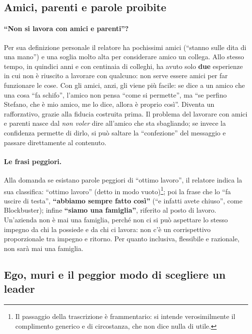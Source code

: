 \subsection{Amici, parenti e parole proibite}

\paragraph{``Non si lavora con amici e parenti''?} Per sua definizione
personale il relatore ha pochissimi amici (``stanno sulle dita di una mano'')
e una soglia molto alta per considerare amico un collega. Allo stesso tempo,
in quindici anni e con centinaia di colleghi, ha avuto solo \textbf{due}
esperienze in cui non è riuscito a lavorare con qualcuno: non serve essere
amici per far funzionare le cose. Con gli amici, anzi, gli viene più facile:
se dice a un amico che una cosa ``fa schifo'', l'amico non pensa ``come si
permette'', ma ``se perfino Stefano, che è mio amico, me lo dice, allora è
proprio così''. Diventa un rafforzativo, grazie alla fiducia costruita prima.
Il problema del lavorare con amici e parenti nasce dal \emph{non voler} dire
all'amico che sta sbagliando; se invece la confidenza permette di dirlo, si
può saltare la ``confezione'' del messaggio e passare direttamente al
contenuto.

\paragraph{Le frasi peggiori.} Alla domanda se esistano parole peggiori di
``ottimo lavoro'', il relatore indica la sua classifica: ``ottimo lavoro''
(detto in modo vuoto)\footnote{Il passaggio della trascrizione è
frammentario: si intende verosimilmente il complimento generico e di
circostanza, che non dice nulla di utile.}; poi la frase che lo ``fa uscire di
testa'', \textbf{``abbiamo sempre fatto così''} (``e infatti avete chiuso'',
come Blockbuster); infine \textbf{``siamo una famiglia''}, riferito al posto di
lavoro. Un'azienda non è mai una famiglia, perché non ci si può aspettare lo
stesso impegno da chi la possiede e da chi ci lavora: non c'è un
corrispettivo proporzionale tra impegno e ritorno. Per quanto inclusiva,
flessibile e razionale, non sarà mai una famiglia.

\subsection{Ego, muri e il peggior modo di scegliere un leader}

